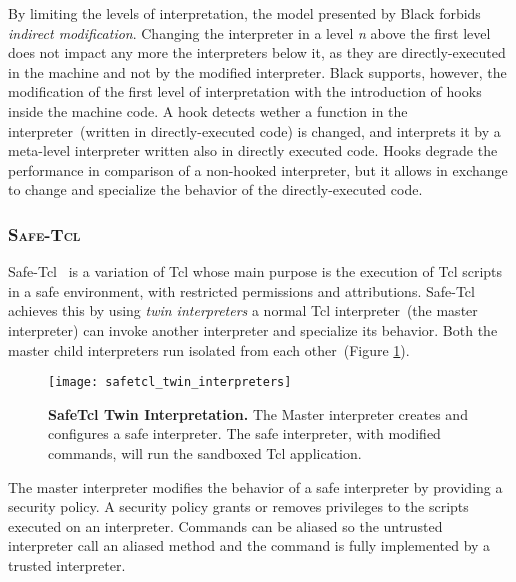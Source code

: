 By limiting the levels of interpretation, the model presented by Black forbids \emph{indirect modification}. Changing the interpreter in a level \emph{n} above the first level does not impact any more the interpreters below it, as they are directly-executed in the machine and not by the modified interpreter. Black supports, however, the modification of the first level of interpretation with the introduction of hooks inside the machine code. A hook detects wether a function in the interpreter~(written in directly-executed code) is changed, and interprets it by a meta-level interpreter written also in directly executed code. Hooks degrade the performance in comparison of a non-hooked interpreter, but it allows in exchange to change and specialize the behavior of the directly-executed code.

\subsubsection*{\textsc{Safe-Tcl}}
Safe-Tcl~\cite{Levy97a, Bore94a} is a variation of Tcl whose main purpose is the execution of Tcl scripts in a safe environment, with restricted permissions and attributions. Safe-Tcl achieves this by using \emph{twin interpreters} \ie a normal Tcl interpreter~(the master interpreter) can invoke another interpreter and specialize its behavior. Both the master child interpreters run isolated from each other~(Figure \ref{fig:safetcl_twin_interpreters}).

\begin{figure}[ht]
\begin{center}
\texttt{[image: safetcl\_twin\_interpreters]}
\caption{\textbf{SafeTcl Twin Interpretation.} The Master interpreter creates and configures a safe interpreter. The safe interpreter, with modified commands, will run the sandboxed Tcl application.\label{fig:safetcl_twin_interpreters}
 }
\end{center}
\end{figure}

The master interpreter modifies the behavior of a safe interpreter by providing a security policy. A security policy grants or removes privileges to the scripts executed on an interpreter. Commands can be aliased so the untrusted interpreter call an aliased method and the command is fully implemented by a trusted interpreter.

